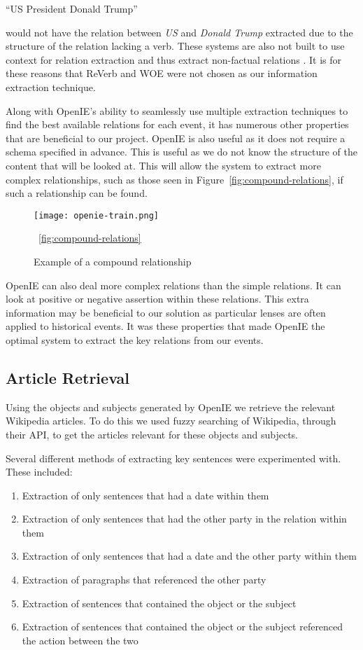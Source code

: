 \documentclass[bsc,frontabs,twoside,singlespacing,parskip,deptreport]{infthesis}     %
\begin{document}
``US President Donald Trump''

would not have the relation between \textit{US} and \textit{Donald Trump} extracted due to the structure of the relation lacking a verb.
These systems are also not built to use context for relation extraction and thus extract non-factual relations \cite{schmitz2012open}.
It is for these reasons that ReVerb and WOE were not chosen as our information extraction technique.


Along with OpenIE's ability to seamlessly use multiple extraction techniques to find the best available
relations for each event, it has numerous other properties that are beneficial to our project.
OpenIE is also useful as it does not require a schema specified in advance.
This is useful as we do not know the structure of the content that will be looked at.
This will allow the system to extract
more complex relationships, such as those seen in Figure~\ref{fig:compound-relations}, if such
a relationship can be found.


\begin{figure}[h]
  \centering
  \texttt{[image: openie-train.png]}
  \caption{Example of a compound relationship \cite{OpenIE}}
 ~\ref{fig:compound-relations}
  \end{figure}

OpenIE can also deal more complex relations  than the simple relations.
It can look at positive or negative assertion within these relations.
This extra information may be beneficial to our solution as particular lenses are often applied to historical events.
It was these properties that made OpenIE the optimal system to extract the key relations from our events.


\subsection{Article Retrieval}
Using the objects and subjects generated by OpenIE we retrieve the relevant Wikipedia articles.
To do this we used fuzzy searching of Wikipedia, through their API, to get the articles relevant
for these objects and subjects.

Several different methods of extracting key sentences were experimented with.
These included:
\begin{enumerate}
  \item Extraction of only sentences that had a date within them
  \item Extraction of only sentences that had the other party in the relation within them
  \item Extraction of only sentences that had a date and the other party within them
  \item Extraction of paragraphs that referenced the other party
  \item Extraction of sentences that contained the object or the subject 
  \item Extraction of sentences that contained the object or the subject referenced the action between the two 
\end{enumerate}
\end{document}
